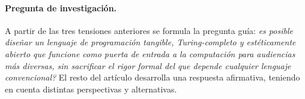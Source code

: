 \paragraph{Pregunta de investigaci\'on.}
A partir de las tres tensiones anteriores se formula la pregunta gu\'ia:
\emph{\textquestiondown es posible dise\~nar un lenguaje de
programaci\'on tangible, Turing-completo y est\'eticamente abierto que
funcione como puerta de entrada a la computaci\'on para audiencias
m\'as diversas, sin sacrificar el rigor formal del que
depende cualquier lenguaje convencional?} El resto del art\'iculo desarrolla
una respuesta afirmativa, teniendo en cuenta distintas perspectivas y alternativas.

\endinput
